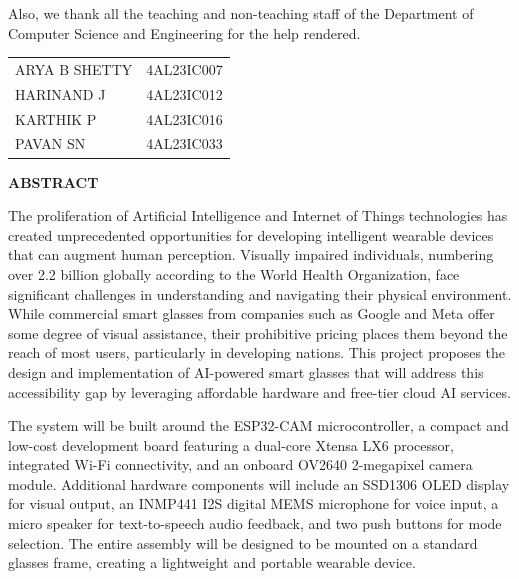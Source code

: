 \documentclass[12pt,a4paper]{report}
\begin{document}
\vspace{0.5cm}
Also, we thank all the teaching and non-teaching staff of the Department of Computer Science and Engineering for the help rendered.

\vspace{2cm}
\begin{center}
\begin{tabular}{l r}
ARYA B SHETTY & 4AL23IC007 \\
HARINAND J & 4AL23IC012 \\
KARTHIK P & 4AL23IC016 \\
PAVAN SN & 4AL23IC033 \\
\end{tabular}
\end{center}
\newpage

\thispagestyle{empty}
\begin{center}
\textbf{\Large ABSTRACT}\\[0.5cm]
\end{center}

The proliferation of Artificial Intelligence and Internet of Things technologies has created unprecedented opportunities for developing intelligent wearable devices that can augment human perception. Visually impaired individuals, numbering over 2.2 billion globally according to the World Health Organization, face significant challenges in understanding and navigating their physical environment. While commercial smart glasses from companies such as Google and Meta offer some degree of visual assistance, their prohibitive pricing places them beyond the reach of most users, particularly in developing nations. This project proposes the design and implementation of AI-powered smart glasses that will address this accessibility gap by leveraging affordable hardware and free-tier cloud AI services.

\vspace{0.3cm}
The system will be built around the ESP32-CAM microcontroller, a compact and low-cost development board featuring a dual-core Xtensa LX6 processor, integrated Wi-Fi connectivity, and an onboard OV2640 2-megapixel camera module. Additional hardware components will include an SSD1306 OLED display for visual output, an INMP441 I2S digital MEMS microphone for voice input, a micro speaker for text-to-speech audio feedback, and two push buttons for mode selection. The entire assembly will be designed to be mounted on a standard glasses frame, creating a lightweight and portable wearable device.
\end{document}
